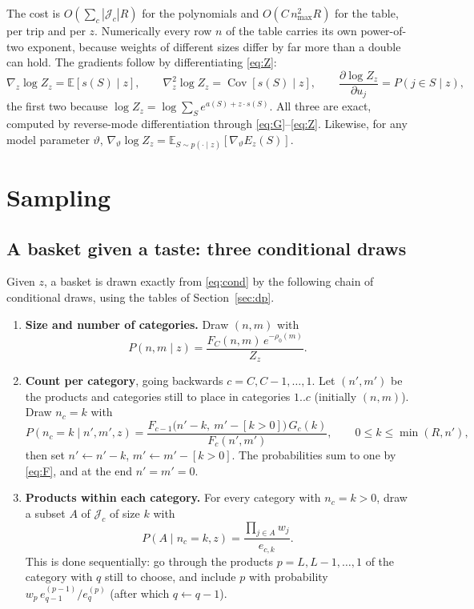 \documentclass[11pt,a4paper]{article}
\theoremstyle{remark}
\newcommand{\E}{\mathbb E}
\newcommand{\Cov}{\operatorname{Cov}}
\begin{document}
The cost is $O(\sum_c|\mathcal J_c|R)$ for the polynomials and $O(C\,n_{\max}^2R)$ for the table, per trip
and per $z$. Numerically every row $n$ of the table carries its own power-of-two exponent, because weights
of different sizes differ by far more than a double can hold. The gradients follow by differentiating
\eqref{eq:Z}:
\begin{equation}
\nabla_z\log Z_z=\E[s(S)\mid z],\qquad \nabla^2_z\log Z_z=\Cov[s(S)\mid z],\qquad
\frac{\partial\log Z_z}{\partial u_j}=P(j\in S\mid z),
\label{eq:grads}
\end{equation}
the first two because $\log Z_z=\log\sum_Se^{a(S)+z\cdot s(S)}$. All three are exact, computed by
reverse-mode differentiation through \eqref{eq:G}--\eqref{eq:Z}. Likewise, for any model parameter
$\vartheta$, $\nabla_\vartheta\log Z_z=\E_{S\sim p(\cdot\mid z)}[\nabla_\vartheta E_z(S)]$.

\section{Sampling}
\label{sec:sampling}

\subsection{A basket given a taste: three conditional draws}

Given $z$, a basket is drawn exactly from \eqref{eq:cond} by the following chain of conditional draws,
using the tables of Section~\ref{sec:dp}.

\begin{enumerate}[label=\textbf{Step \Alph*.},leftmargin=*]
\item \textbf{Size and number of categories.} Draw $(n,m)$ with
  \begin{equation}
  P(n,m\mid z)=\frac{F_C(n,m)\,e^{-\rho_0(m)}}{Z_z}.
  \label{eq:stepA}
  \end{equation}
\item \textbf{Count per category}, going backwards $c=C,C-1,\dots,1$. Let $(n',m')$ be the products and
  categories still to place in categories $1..c$ (initially $(n,m)$). Draw $n_c=k$ with
  \begin{equation}
  P(n_c=k\mid n',m',z)=\frac{F_{c-1}\big(n'-k,\ m'-[k>0]\big)\,G_c(k)}{F_c(n',m')},\qquad 0\le k\le\min(R,n'),
  \label{eq:stepB}
  \end{equation}
  then set $n'\leftarrow n'-k$, $m'\leftarrow m'-[k>0]$. The probabilities sum to one by \eqref{eq:F}, and at the
  end $n'=m'=0$.
\item \textbf{Products within each category.} For every category with $n_c=k>0$, draw a subset $A$ of
  $\mathcal J_c$ of size $k$ with
  \begin{equation}
  P(A\mid n_c=k,z)=\frac{\prod_{j\in A}w_j}{e_{c,k}}.
  \label{eq:stepC}
  \end{equation}
  This is done sequentially: go through the products $p=L,L-1,\dots,1$ of the category with $q$ still to
  choose, and include $p$ with probability $w_p\,e^{(p-1)}_{q-1}/e^{(p)}_q$ (after which $q\leftarrow q-1$).
\end{enumerate}
\end{document}
